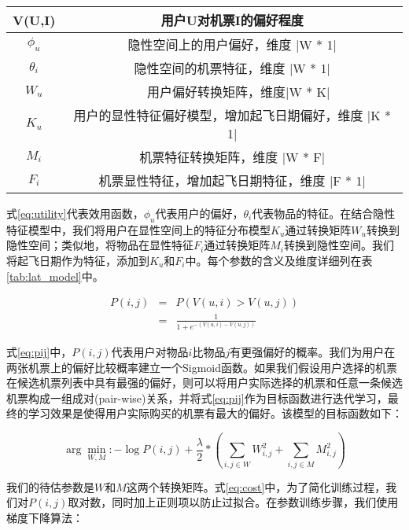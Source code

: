 \begin{table}[!hpb]
  \centering
  \begin{tabular}{|c|c|} \hline 
V(U,I) & 用户U对机票I的偏好程度 \\ \hline
$\phi_u$ & 隐性空间上的用户偏好，维度 |W * 1| \\ \hline
$\theta_i$ & 隐性空间的机票特征，维度 |W * 1| \\ \hline
$W_u$ &　用户偏好转换矩阵，维度|W * K| \\ \hline
$K_u$ & 用户的显性特征偏好模型，增加起飞日期偏好，维度 |K * 1| \\ \hline
$M_i$ & 机票特征转换矩阵，维度 |W * F| \\ \hline
$F_i$ & 机票显性特征，增加起飞日期特征，维度 |F * 1| \\ \hline
  \end{tabular}
\end{table}

式\ref{eq:utility}代表效用函数，$\phi_u$代表用户的偏好，$\theta_i$代表物品的特征。在结合隐性特征模型中，我们将用户在显性空间上的特征分布模型$K_u$通过转换矩阵$W_u$转换到隐性空间；类似地，将物品在显性特征$F_i$通过转换矩阵$M_i$转换到隐性空间。我们将起飞日期作为特征，添加到$K_u$和$F_i$中。每个参数的含义及维度详细列在表\ref{tab:lat_model}中。

\begin{eqnarray}
\label{eq:pij}
    P(i,j) & = & P(V(u,i) > V(u,j)) \nonumber \\
	 & = &\frac{1}{1+e^{-(V(u,i) - V(u,j))}}
\end{eqnarray}

式\ref{eq:pij}中，$P(i,j)$代表用户对物品$i$比物品$j$有更强偏好的概率。我们为用户在两张机票上的偏好比较概率建立一个Sigmoid函数\cite{yonaba2010comparing}。如果我们假设用户选择的机票在候选机票列表中具有最强的偏好，则可以将用户实际选择的机票和任意一条候选机票构成一组成对(pair-wise)关系，并将式\ref{eq:pij}作为目标函数进行迭代学习，最终的学习效果是使得用户实际购买的机票有最大的偏好。该模型的目标函数如下：

\begin{equation}
\label{eq:cost}
  \arg\min_{W,M} : - \log P(i,j) + \frac{\lambda}{2} * (\sum_{i,j \in W}W_{i,j}^2 + \sum_{i,j \in M}M_{i,j}^2)
\end{equation}

我们的待估参数是$W$和$M$这两个转换矩阵。式\ref{eq:cost}中，为了简化训练过程，我们对$P(i,j)$取对数，同时加上正则项以防止过拟合。在参数训练步骤，我们使用梯度下降算法：

